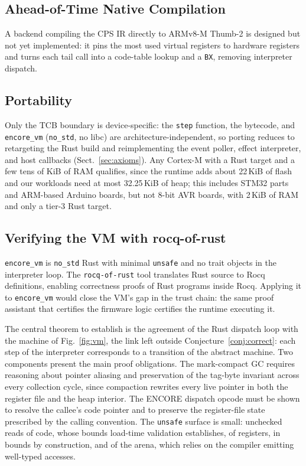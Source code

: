 \documentclass[runningheads]{llncs}
\newcommand{\code}[1]{\texttt{#1}}
\begin{document}
\subsection{Ahead-of-Time Native Compilation}

A backend compiling the CPS IR directly to ARMv8-M Thumb-2 is designed but not yet implemented: it pins the most used virtual registers to hardware registers and turns each tail call into a code-table lookup and a \code{BX}, removing interpreter dispatch.

\subsection{Portability}
\label{sec:portability}

Only the TCB boundary is device-specific: the \code{step} function, the bytecode, and \code{encore\_vm} (\code{no\_std}, no libc) are architecture-independent, so porting reduces to retargeting the Rust build and reimplementing the event poller, effect interpreter, and host callbacks (Sect.~\ref{sec:axioms}).
Any Cortex-M with a Rust target and a few tens of KiB of RAM qualifies, since the runtime adds about 22\,KiB of flash and our workloads need at most 32.25\,KiB of heap; this includes STM32 parts and ARM-based Arduino boards, but not 8-bit AVR boards, with 2\,KiB of RAM and only a tier-3 Rust target.

\subsection{Verifying the VM with rocq-of-rust}

\code{encore\_vm} is \code{no\_std} Rust with minimal \code{unsafe} and no trait objects in the interpreter loop.
The \code{rocq-of-rust} tool \cite{ho2024rocqofrust} translates Rust source to Rocq definitions, enabling correctness proofs of Rust programs inside Rocq.
Applying it to \code{encore\_vm} would close the VM's gap in the trust chain: the same proof assistant that certifies the firmware logic certifies the runtime executing it.

The central theorem to establish is the agreement of the Rust dispatch loop with the machine of Fig.~\ref{fig:vm}, the link left outside Conjecture~\ref{conj:correct}: each step of the interpreter corresponds to a transition of the abstract machine.
Two components present the main proof obligations.
The mark-compact GC requires reasoning about pointer aliasing and preservation of the tag-byte invariant across every collection cycle, since compaction rewrites every live pointer in both the register file and the heap interior.
The ENCORE dispatch opcode must be shown to resolve the callee's code pointer and to preserve the register-file state prescribed by the calling convention.
The \code{unsafe} surface is small: unchecked reads of code, whose bounds load-time validation establishes, of registers, in bounds by construction, and of the arena, which relies on the compiler emitting well-typed accesses.
\end{document}
